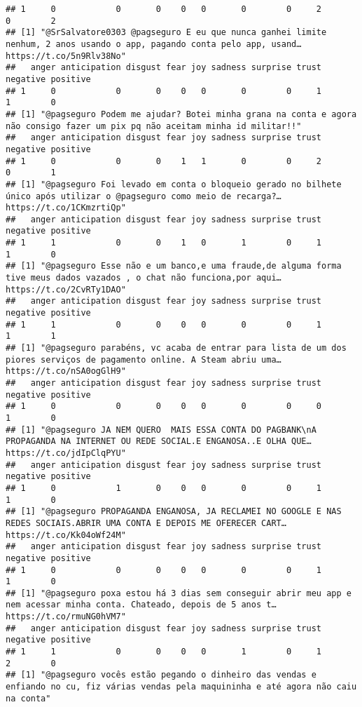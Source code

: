\documentclass[
]{article}
\begin{document}
\begin{verbatim}
## 1     0            0       0    0   0       0        0     2        0        2
## [1] "@SrSalvatore0303 @pagseguro E eu que nunca ganhei limite nenhum, 2 anos usando o app, pagando conta pelo app, usand… https://t.co/5n9Rlv38No"
##   anger anticipation disgust fear joy sadness surprise trust negative positive
## 1     0            0       0    0   0       0        0     1        1        0
## [1] "@pagseguro Podem me ajudar? Botei minha grana na conta e agora não consigo fazer um pix pq não aceitam minha id militar!!"
##   anger anticipation disgust fear joy sadness surprise trust negative positive
## 1     0            0       0    1   1       0        0     2        0        1
## [1] "@pagseguro Foi levado em conta o bloqueio gerado no bilhete único após utilizar o @pagseguro como meio de recarga?… https://t.co/1CKmzrtiQp"
##   anger anticipation disgust fear joy sadness surprise trust negative positive
## 1     1            0       0    1   0       1        0     1        1        0
## [1] "@pagseguro Esse não e um banco,e uma fraude,de alguma forma tive meus dados vazados , o chat não funciona,por aqui… https://t.co/2CvRTy1DAO"
##   anger anticipation disgust fear joy sadness surprise trust negative positive
## 1     1            0       0    0   0       0        0     1        1        1
## [1] "@pagseguro parabéns, vc acaba de entrar para lista de um dos piores serviços de pagamento online. A Steam abriu uma… https://t.co/nSA0ogGlH9"
##   anger anticipation disgust fear joy sadness surprise trust negative positive
## 1     0            0       0    0   0       0        0     0        1        0
## [1] "@pagseguro JA NEM QUERO  MAIS ESSA CONTA DO PAGBANK\nA PROPAGANDA NA INTERNET OU REDE SOCIAL.E ENGANOSA..E OLHA QUE… https://t.co/jdIpClqPYU"
##   anger anticipation disgust fear joy sadness surprise trust negative positive
## 1     0            1       0    0   0       0        0     1        1        0
## [1] "@pagseguro PROPAGANDA ENGANOSA, JA RECLAMEI NO GOOGLE E NAS REDES SOCIAIS.ABRIR UMA CONTA E DEPOIS ME OFERECER CART… https://t.co/Kk04oWf24M"
##   anger anticipation disgust fear joy sadness surprise trust negative positive
## 1     0            0       0    0   0       0        0     1        1        0
## [1] "@pagseguro poxa estou há 3 dias sem conseguir abrir meu app e nem acessar minha conta. Chateado, depois de 5 anos t… https://t.co/rmuNG0hVM7"
##   anger anticipation disgust fear joy sadness surprise trust negative positive
## 1     1            0       0    0   0       1        0     1        2        0
## [1] "@pagseguro vocês estão pegando o dinheiro das vendas e enfiando no cu, fiz várias vendas pela maquininha e até agora não caiu na conta"

\end{verbatim}
\end{document}
